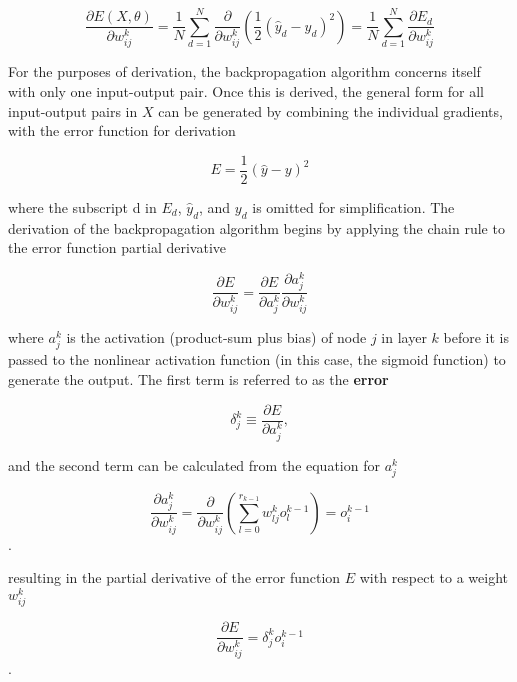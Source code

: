 \documentclass[main.tex]{subfiles}
\begin{document}
\begin{enumerate}
\begin{enumerate}
        \begin{equation} \label{partialErrorPartialWeightDecomposedSum}
        \frac{\partial E(X, \theta)}{\partial w_{i j}^{k}}=\frac{1}{N} \sum_{d=1}^{N} \frac{\partial}{\partial w_{i j}^{k}}\left(\frac{1}{2}\left(\hat{y}_{d}-y_{d}\right)^{2}\right)=\frac{1}{N} \sum_{d=1}^{N} \frac{\partial E_{d}}{\partial w_{i j}^{k}}
        \end{equation}
        
        For the purposes of derivation, the backpropagation algorithm concerns itself with only one input-output pair. Once this is derived, the general form for all input-output pairs in $X$ can be generated by combining the individual gradients, with the error function for derivation 
        
        \begin{equation} \label{errorFunction}
        E=\frac{1}{2}(\hat{y}-y)^{2}
        \end{equation}
        
        where the subscript d in $E_d$, $\hat{y}_d$, and $y_d$ is omitted for simplification. The derivation of the backpropagation algorithm begins by applying the chain rule to the error function partial derivative 
       
        $$\frac{\partial E}{\partial w_{i j}^{k}}=\frac{\partial E}{\partial a_{j}^{k}} \frac{\partial a_{j}^{k}}{\partial w_{i j}^{k}}$$
       
        where $a_j^k$ is the activation (product-sum plus bias) of node $j$ in layer $k$ before it is passed to the nonlinear activation function (in this case, the sigmoid function) to generate the output. The first term is referred to as the \textbf{error}
        
        $$\delta_{j}^{k} \equiv \frac{\partial E}{\partial a_{j}^{k}},$$
       
        and the second term can be calculated from the equation for $a_j^k$  
        
        $$\frac{\partial a_{j}^{k}}{\partial w_{i j}^{k}}=\frac{\partial}{\partial w_{i j}^{k}}\left(\sum_{l=0}^{r_{k-1}} w_{l j}^{k} o_{l}^{k-1}\right)=o_{i}^{k-1}$$.
        
        resulting in the partial derivative of the error function $E$ with respect to a weight $w_{ij}^k$ 
        
        $$\frac{\partial E}{\partial w_{i j}^{k}}=\delta_{j}^{k} o_{i}^{k-1}$$.
        

\end{enumerate}
\end{enumerate}
\end{document}

